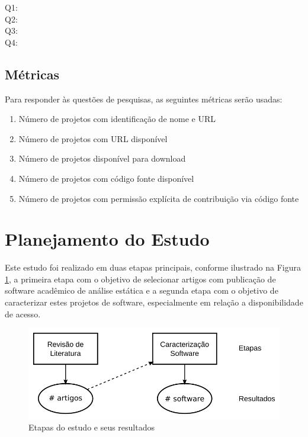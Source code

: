 \begin{description}
  \item [Q1:] \EstudoUmQuestaoUm
  \item [Q2:] \EstudoUmQuestaoDois
  \item [Q3:] \EstudoUmQuestaoTres
  \item [Q4:] \EstudoUmQuestaoQuatro
\end{description}

\subsection{Métricas}

Para responder às questões de pesquisas, as seguintes métricas serão usadas:

\begin{enumerate}
  \item Número de projetos com identificação de nome e URL
  \item Número de projetos com URL disponível
  \item Número de projetos disponível para download
  \item Número de projetos com código fonte disponível
  \item Número de projetos com permissão explícita de contribuição via código fonte
\end{enumerate}


\section{Planejamento do Estudo} \label{estudo1:planejamento} %

Este estudo foi realizado em duas etapas principais, conforme ilustrado na
Figura \ref{estudo1-etapas}, a primeira etapa com o objetivo de selecionar
artigos com publicação de software acadêmico de análise estática e a segunda
etapa com o objetivo de caracterizar estes projetos de software, especialmente
em relação a disponibilidade de acesso.

\begin{figure}[h]
  \center
  \includegraphics[scale=0.4]{imagens/estudo1-etapas.png}
  \caption{Etapas do estudo e seus resultados}
  \label{estudo1-etapas}
\end{figure}

